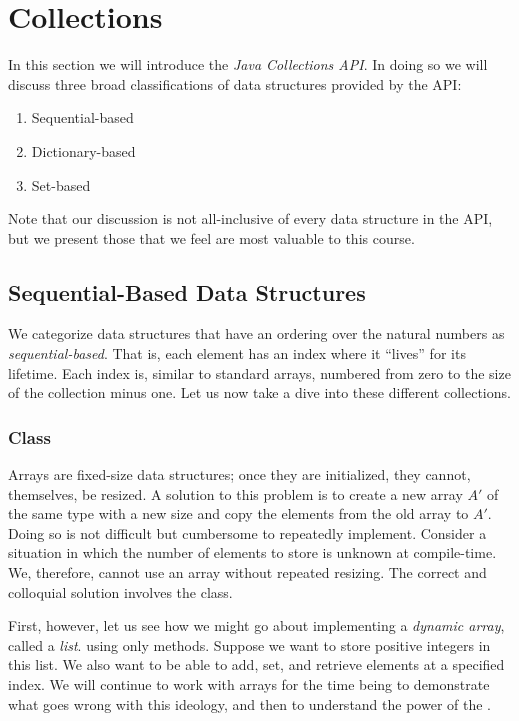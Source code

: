 \section{Collections}

In this section we will introduce the \emph{Java Collections API}. In doing so we will discuss three broad classifications of data structures provided by the API:
\begin{enumerate}
    \item Sequential-based
    \item Dictionary-based
    \item Set-based
\end{enumerate}
Note that our discussion is not all-inclusive of every data structure in the API, but we present those that we feel are most valuable to this course.

\subsection{Sequential-Based Data Structures}
We categorize data structures that have an ordering over the natural numbers as \emph{sequential-based}. That is, each element has an index where it ``lives'' for its lifetime. Each index is, similar to standard arrays, numbered from zero to the size of the collection minus one. Let us now take a dive into these different collections.
\subsubsection*{ Class}
Arrays are fixed-size data structures; once they are initialized, they cannot, themselves, be resized. A solution to this problem is to create a new array $A'$ of the same type with a new size and copy the elements from the old array to $A'$. Doing so is not difficult but cumbersome to repeatedly implement. Consider a situation in which the number of elements to store is unknown at compile-time. We, therefore, cannot use an array without repeated resizing. The correct and colloquial solution involves the  class.

First, however, let us see how we might go about implementing a \emph{dynamic array}, called a \emph{list}. using only methods. Suppose we want to store positive integers in this list. We also want to be able to add, set, and retrieve elements at a specified index. We will continue to work with arrays for the time being to demonstrate what goes wrong with this ideology, and then to understand the power of the .

